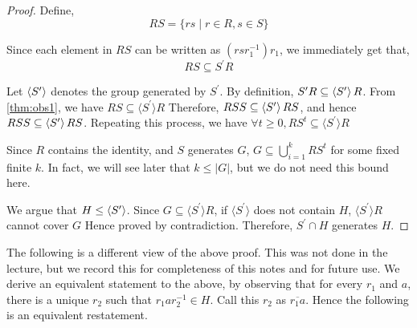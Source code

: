 \begin{proof}

Define, 
$$RS = \lbrace rs \mid r \in R, s \in S \rbrace$$

Since each element in $RS$ can be written as $(r s r_1^{-1}) r_1$, we immediately get that,
\begin{equation}
RS \subseteq S^\prime R
\label{thm:obs1}
\end{equation}

Let $\left\langle S^\prime \right\rangle$ denotes the group generated by $S^\prime$. By definition, $S^\prime R \subseteq \left\langle S^\prime \right\rangle R$. From \ref{thm:obs1}, we have $RS \subseteq \langle S^\prime \rangle R$
Therefore, $RSS \subseteq \left\langle S^\prime \right\rangle RS$, and hence $RSS \subseteq \left\langle S^\prime \right\rangle RS$. Repeating this process, we have
$\forall t \geq 0, RS^t \subseteq \langle S^\prime \rangle R$

Since $R$ contains the identity, and $S$ generates $G$, $G \subseteq \bigcup\limits_{i=1}^k RS^t$ for some fixed finite $k$. In fact, we will see later that $k \le |G|$, but we do not need this bound here.

We argue that $H \le \left\langle S^\prime \right\rangle$. Since $G \subseteq \langle S^\prime \rangle R$, if $\langle S^\prime \rangle$ does not contain $H$, $\langle S^\prime \rangle R $ cannot cover $G$ Hence proved by contradiction. Therefore, $S^\prime \cap H$ generates $H$.
\end{proof}

The following is a different view of the above proof. This was not done in the lecture, but we record this for completeness of this notes and for future use. We derive an equivalent statement to the above, by observing that for every $r_1$ and $a$, there is a unique $r_2$ such that $r_1ar_2^{-1} \in H$. Call this $r_2$ as $\overline{r_1a}$. Hence the following is an equivalent restatement.

